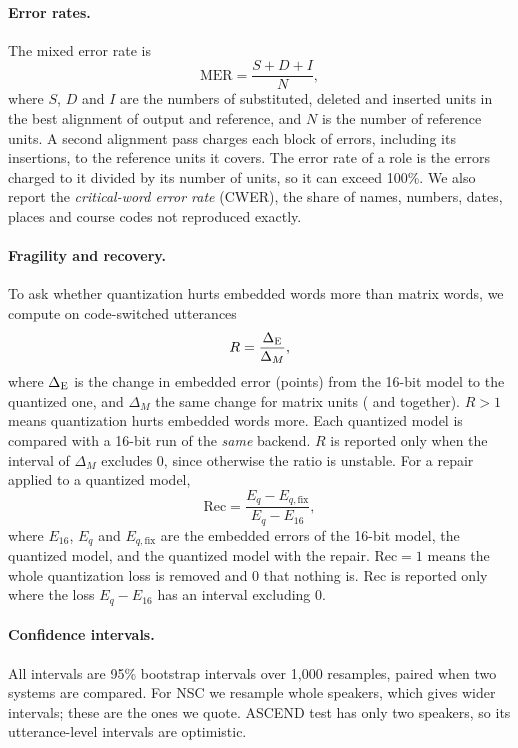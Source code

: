 \paragraph{Error rates.}
The mixed error rate is
\begin{equation}
  \text{MER} = \frac{S + D + I}{N},
\end{equation}
where $S$, $D$ and $I$ are the numbers of substituted, deleted and inserted units in the best alignment of output and reference, and $N$ is the number of reference units.
A second alignment pass charges each block of errors, including its insertions, to the reference units it covers. The error rate of a role is the errors charged to it divided by its number of units, so it can exceed 100\%. We also report the \emph{critical-word error rate} (CWER), the share of names, numbers, dates, places and course codes not reproduced exactly.

\paragraph{Fragility and recovery.}
To ask whether quantization hurts embedded words more than matrix words, we compute on code-switched utterances
\begin{equation}
  R = \frac{\Delta_{\textsc{E}}}{\Delta_{M}},
\end{equation}
where $\Delta_{\textsc{E}}$ is the change in embedded error (points) from the 16-bit model to the quantized one, and $\Delta_{M}$ the same change for matrix units (\Ms{} and \Mi{} together). $R>1$ means quantization hurts embedded words more. Each quantized model is compared with a 16-bit run of the \emph{same} backend. $R$ is reported only when the interval of $\Delta_M$ excludes 0, since otherwise the ratio is unstable. For a repair applied to a quantized model,
\begin{equation}
  \text{Rec} = \frac{E_{q} - E_{q,\text{fix}}}{E_{q} - E_{16}},
\end{equation}
where $E_{16}$, $E_{q}$ and $E_{q,\text{fix}}$ are the embedded errors of the 16-bit model, the quantized model, and the quantized model with the repair. $\text{Rec}=1$ means the whole quantization loss is removed and $0$ that nothing is. Rec is reported only where the loss $E_q - E_{16}$ has an interval excluding 0.

\paragraph{Confidence intervals.}
All intervals are 95\% bootstrap intervals over 1{,}000 resamples, paired when two systems are compared. For NSC we resample whole speakers, which gives wider intervals; these are the ones we quote. ASCEND test has only two speakers, so its utterance-level intervals are optimistic.

